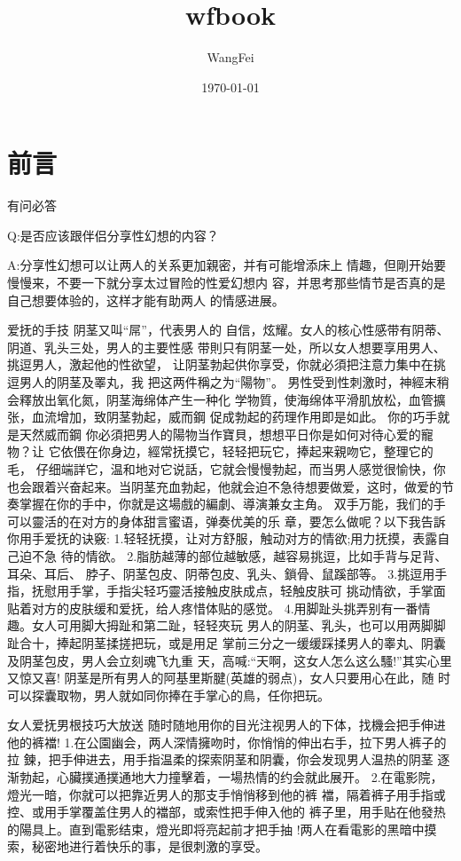 \documentclass[12pt,UTF8]{ctexbook}
\title{\heiti\zihao{0} wfbook}
\author{WangFei}
\date{\today}
\begin{document}
\maketitle
\tableofcontents

\frontmatter

\chapter{前言}

有问必答

Q:是否应该跟伴侣分享性幻想的内容？

A:分享性幻想可以让两人的关系更加親密，并有可能增添床上
情趣，但剛开始要慢慢来，不要一下就分享太过冒险的性爱幻想内
容，并思考那些情节是否真的是自己想要体验的，这样才能有助两人
的情感进展。

爱抚的手技
阴茎又叫“屌”，代表男人的
自信，炫耀。女人的核心性感带有阴蒂、阴道、乳头三处，男人的主要性感
带則只有阴茎一处，所以女人想要享用男人、挑逗男人，激起他的性欲望，
让阴茎勃起供你享受，你就必須把注意力集中在挑逗男人的阴茎及睪丸，我
把这两件稱之为“陽物”。
男性受到性刺激时，神經末稍会釋放出氧化氮，阴茎海绵体产生一种化
学物質，使海绵体平滑肌放松，血管擴张，血流增加，致阴茎勃起，威而鋼
促成勃起的药理作用即是如此。
你的巧手就是天然威而鋼
你必須把男人的陽物当作寶貝，想想平日你是如何对待心爱的寵物？让
它依偎在你身边，經常抚摸它，轻轻把玩它，捧起来親吻它，整理它的毛，
仔细端詳它，温和地对它说話，它就会慢慢勃起，而当男人感觉很愉快，你
也会跟着兴奋起来。当阴茎充血勃起，他就会迫不急待想要做爱，这时，做爱的节奏掌握在你的手中，你就是这場戲的編劇、導演兼女主角。
双手万能，我们的手可以靈活的在对方的身体甜言蜜语，弹奏优美的乐
章，要怎么做呢？以下我告訴你用手爱抚的诀竅:
1.轻轻抚摸，让对方舒服，触动对方的情欲;用力抚摸，表露自己迫不急
待的情欲。
2.脂肪越薄的部位越敏感，越容易挑逗，比如手背与足背、耳朵、耳后、
脖子、阴茎包皮、阴蒂包皮、乳头、鎖骨、鼠蹊部等。
3.挑逗用手指，抚慰用手掌，手指尖轻巧靈活接触皮肤成点，轻触皮肤可
挑动情欲，手掌面贴着对方的皮肤缓和爱抚，给人疼惜体贴的感觉。
4.用脚趾头挑弄别有一番情趣。女人可用脚大拇趾和第二趾，轻轻夾玩
男人的阴茎、乳头，也可以用两脚脚趾合十，捧起阴茎揉搓把玩，或是用足
掌前三分之一缓缓踩揉男人的睾丸、阴囊及阴茎包皮，男人会立刻魂飞九重
天，高喊:“天啊，这女人怎么这么騷!”其实心里又惊又喜!
阴茎是所有男人的阿基里斯腱(英雄的弱点)，女人只要用心在此，随
时可以探囊取物，男人就如同你捧在手掌心的鳥，任你把玩。

女人爱抚男根技巧大放送
随时随地用你的目光注视男人的下体，找機会把手伸进他的裤襠!
1.在公園幽会，两人深情擁吻时，你悄悄的伸出右手，拉下男人裤子的拉
鍊，把手伸进去，用手指温柔的探索阴茎和阴囊，你会发现男人温热的阴茎
逐渐勃起，心臟撲通撲通地大力撞擊着，一場热情的约会就此展开。
2.在電影院，燈光一暗，你就可以把靠近男人的那支手悄悄移到他的裤
襠，隔着裤子用手指或控、或用手掌覆盖住男人的襠部，或索性把手伸入他的
裤子里，用手贴在他發热的陽具上。直到電影结束，燈光即将亮起前才把手抽
!两人在看電影的黑暗中摸索，秘密地进行着快乐的事，是很刺激的享受。
\end{document}

